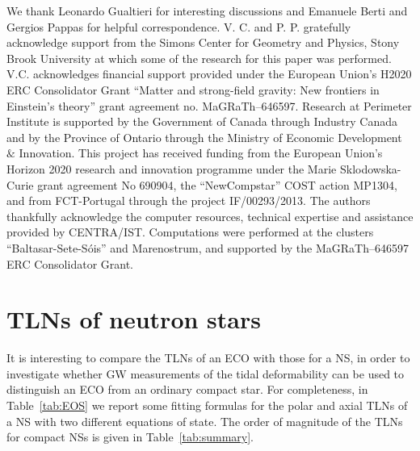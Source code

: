 \documentclass[aps,twocolumn,showpacs,preprintnumbers,nofootinbib,prd,superscriptaddress,groupedaddress,10pt]{revtex4-1}
\begin{document}
\begin{acknowledgments}
%
We thank Leonardo Gualtieri for interesting discussions and Emanuele Berti and Gergios Pappas for helpful correspondence.
%
V. C. and P. P. gratefully acknowledge support from the Simons Center for Geometry and Physics, Stony Brook University at which some of the research for this paper was performed.
%
V.C. acknowledges financial support provided under the European Union's H2020 ERC Consolidator Grant ``Matter and strong-field gravity: New frontiers in Einstein's theory'' grant agreement no. MaGRaTh--646597. Research at Perimeter Institute is supported by the Government of Canada through Industry Canada and by the Province of Ontario through the Ministry of Economic Development $\&$
Innovation.
%
This project has received funding from the European Union's Horizon 2020 research and innovation programme under the Marie Sklodowska-Curie grant agreement No 690904, the ``NewCompstar'' COST action MP1304, and from FCT-Portugal through the project IF/00293/2013.
%
The authors thankfully acknowledge the computer resources, technical expertise and assistance provided by CENTRA/IST. Computations were performed at the clusters
``Baltasar-Sete-S\'ois'' and Marenostrum, and supported by the MaGRaTh--646597 ERC Consolidator Grant.
%
\end{acknowledgments}

\appendix
\section{TLNs of neutron stars\label{section:TLN_stars}}
It is interesting to compare the TLNs of an ECO with those for a NS, in order to investigate whether GW measurements of the tidal deformability can be used to distinguish an ECO from an ordinary compact star. For completeness, in Table~\ref{tab:EOS} we report some fitting formulas for the polar and axial TLNs of a NS with two different equations of state. The order of magnitude of the TLNs for compact NSs is given in Table~\ref{tab:summary}.
\end{document}
